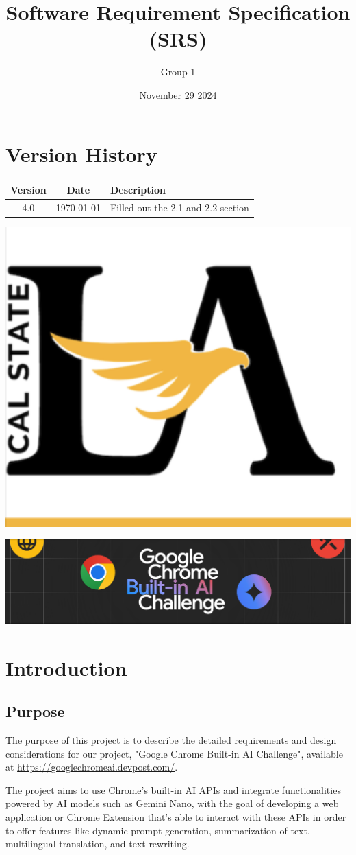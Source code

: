 \documentclass{article}
\title{Software Requirement Specification (SRS)}
\author{Group 1 }
\date{November 29 2024}
\begin{document}
\maketitle  
\pagebreak

\tableofcontents
\pagebreak

\section*{Version History}
\begin{longtable}{|c|c|p{10cm}|}
\hline
\textbf{Version} & \textbf{Date} & \textbf{Description} \\ \hline
4.0 & \today & Filled out the 2.1 and 2.2 section \\ \hline
\end{longtable}
\pagebreak

\includegraphics[width=0.3\linewidth]{../logo/csula.png} 

\includegraphics[width=0.3\linewidth]{../logo/chromeai.png} 

\section{Introduction}
\subsection{Purpose}
The purpose of this project is to describe the detailed requirements and design considerations for our project, "Google Chrome Built-in AI Challenge", available at \url{https://googlechromeai.devpost.com/}.

The project aims to use Chrome's built-in AI APIs and integrate functionalities powered by AI models such as Gemini Nano, with the goal of developing a web application or Chrome Extension that's able to interact with these APIs in order to offer features like dynamic prompt generation, summarization of text, multilingual translation, and text rewriting.
\end{document}
